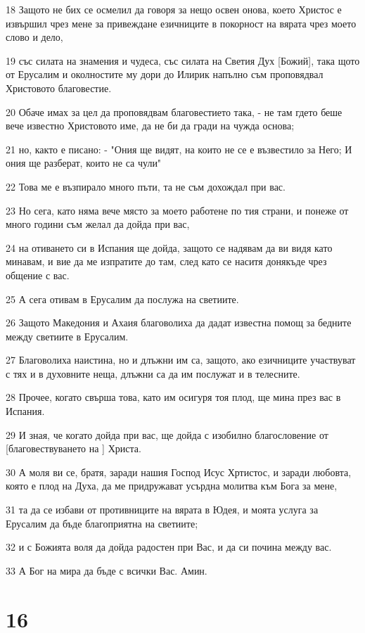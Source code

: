 \par 18 Защото не бих се осмелил да говоря за нещо освен онова, което Христос е извършил чрез мене за привеждане езичниците в покорност на вярата чрез моето слово и дело,
\par 19 със силата на знамения и чудеса, със силата на Светия Дух [Божий], така щото от Ерусалим и околностите му дори до Илирик напълно съм проповядвал Христовото благовестие.
\par 20 Обаче имах за цел да проповядвам благовестието така, - не там гдето беше вече известно Христовото име, да не би да гради на чужда основа;
\par 21 но, както е писано: - "Ония ще видят, на които не се е възвестило за Него; И ония ще разберат, които не са чули"
\par 22 Това ме е възпирало много пъти, та не съм дохождал при вас.
\par 23 Но сега, като няма вече място за моето работене по тия страни, и понеже от много години съм желал да дойда при вас,
\par 24 на отиването си в Испания ще дойда, защото се надявам да ви видя като минавам, и вие да ме изпратите до там, след като се наситя донякъде чрез общение с вас.
\par 25 А сега отивам в Ерусалим да послужа на светиите.
\par 26 Защото Македония и Ахаия благоволиха да дадат известна помощ за бедните между светиите в Ерусалим.
\par 27 Благоволиха наистина, но и длъжни им са, защото, ако езичниците участвуват с тях и в духовните неща, длъжни са да им послужат и в телесните.
\par 28 Прочее, когато свърша това, като им осигуря тоя плод, ще мина през вас в Испания.
\par 29 И зная, че когато дойда при вас, ще дойда с изобилно благословение от [благовествуването на ] Христа.
\par 30 А моля ви се, братя, заради нашия Господ Исус Хртистос, и заради любовта, която е плод на Духа, да ме придружават усърдна молитва към Бога за мене,
\par 31 та да се избави от противниците на вярата в Юдея, и моята услуга за Ерусалим да бъде благоприятна на светиите;
\par 32 и с Божията воля да дойда радостен при Вас, и да си почина между вас.
\par 33 А Бог на мира да бъде с всички Вас. Амин.

\chapter{16}


